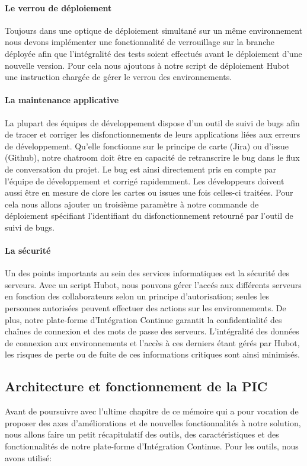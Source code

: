           \paragraph{Le verrou de déploiement} Toujours dans une optique de déploiement simultané sur un même environnement nous devons implémenter une fonctionnalité de verrouillage sur la branche déployée afin que l'intégralité des tests soient effectués avant le déploiement d'une nouvelle version. Pour cela nous ajoutons à notre script de déploiement Hubot une instruction chargée de gérer le verrou des environnements.

          \paragraph{La maintenance applicative} La plupart des équipes de développement dispose d'un outil de suivi de bugs afin de tracer et corriger les disfonctionnements de leurs applications liées aux erreurs de développement. Qu'elle fonctionne sur le principe de carte (Jira) ou d'issue (Github), notre chatroom doit être en capacité de retranscrire le bug dans le flux de conversation du projet. Le bug est ainsi directement pris en compte par l'équipe de développement et corrigé rapidemment. Les développeurs doivent aussi être en mesure de clore les cartes ou issues une fois celles-ci traitées. Pour cela nous allons ajouter un troisième paramètre à notre commande de déploiement spécifiant l'identifiant du disfonctionnement retourné par l'outil de suivi de bugs.

          \paragraph{La sécurité} Un des points importants au sein des services informatiques est la sécurité des serveurs. Avec un script Hubot, nous pouvons gérer l'accés aux différents serveurs en fonction des collaborateurs selon un principe d'autorisation; seules les personnes autorisées peuvent effectuer des actions sur les environnements. De plus, notre plate-forme d'Intégration Continue garantit la confidentialité des chaînes de connexion et des mots de passe des serveurs. L'intégralité des données de connexion aux environnements et l'accès à ces derniers étant gérés par Hubot, les risques de perte ou de fuite de ces informations critiques sont ainsi minimisés.

      \subsection{Architecture et fonctionnement de la PIC}
      Avant de poursuivre avec l'ultime chapitre de ce mémoire qui a pour vocation de proposer des axes d'améliorations et de nouvelles fonctionnalités à notre solution, nous allons faire un petit récapitulatif des outils, des caractéristiques et des fonctionnalités de notre plate-forme d'Intégration Continue. Pour les outils, nous avons utilisé:\\

